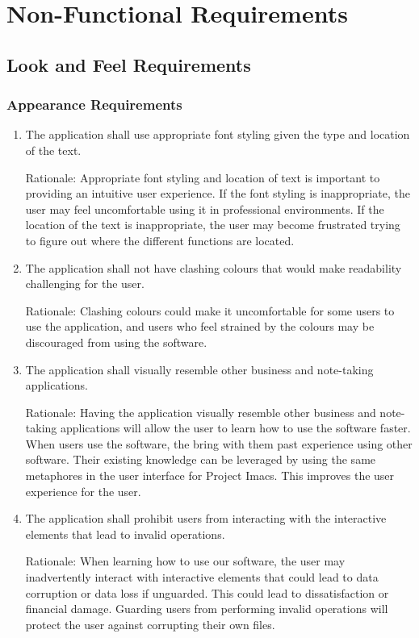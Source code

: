 \documentclass{article}
\begin{document}
\section{Non-Functional Requirements}
\subsection{Look and Feel Requirements}
\subsubsection{Appearance Requirements}
\begin{enumerate}[{A}PR1]
    \item The application shall use appropriate font styling given the type and location of the text.

	Rationale: Appropriate font styling and location of text is important to providing an intuitive user experience. If the font styling is inappropriate, the user may feel uncomfortable using it in professional environments. If the location of the text is inappropriate, the user may become frustrated trying to figure out where the different functions are located.
    \item The application shall not have clashing colours that would make readability challenging for the user.

	Rationale: Clashing colours could make it uncomfortable for some users to use the application, and users who feel strained by the colours may be discouraged from using the software.
    \item The application shall visually resemble other business and note-taking applications.

	Rationale: Having the application visually resemble other business and note-taking applications will allow the user to learn how to use the software faster. When users use the software, the bring with them past experience using other software. Their existing knowledge can be leveraged by using the same metaphores in the user interface for Project Imacs. This improves the user experience for the user.
    \item The application shall prohibit users from interacting with the interactive elements that lead to invalid operations.

	Rationale: When learning how to use our software, the user may inadvertently interact with interactive elements that could lead to data corruption or data loss if unguarded. This could lead to dissatisfaction or financial damage. Guarding users from performing invalid operations will protect the user against corrupting their own files.
\end{enumerate}
\end{document}
